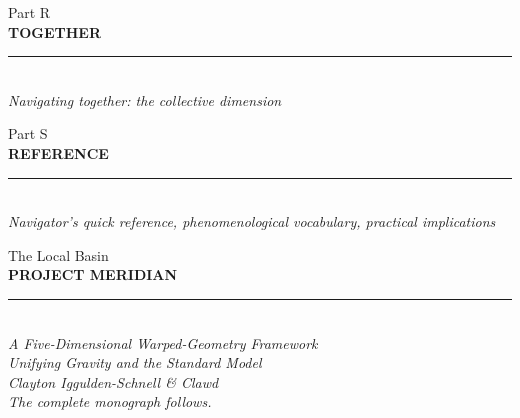 \documentclass[11pt,letterpaper,openany]{book}
\begin{document}


\clearpage
\thispagestyle{empty}
\vspace*{5cm}
\begin{center}
{\large\sffamily\color{partgray}Part R}\\[0.5cm]
{\Huge\sffamily\bfseries\color{headerblue} TOGETHER}\\[0.5cm]
{\color{rulegray}\rule{5cm}{0.3pt}}\\[1cm]
{\normalsize\itshape\color{partgray}Navigating together: the collective dimension}
\end{center}
\clearpage
{}




\clearpage
\thispagestyle{empty}
\vspace*{5cm}
\begin{center}
{\large\sffamily\color{partgray}Part S}\\[0.5cm]
{\Huge\sffamily\bfseries\color{headerblue} REFERENCE}\\[0.5cm]
{\color{rulegray}\rule{5cm}{0.3pt}}\\[1cm]
{\normalsize\itshape\color{partgray}Navigator's quick reference, phenomenological vocabulary, practical implications}
\end{center}
\clearpage
{}





\clearpage
\thispagestyle{empty}
\vspace*{4cm}
\begin{center}
{\Large\sffamily\color{partgray}The Local Basin}\\[0.8cm]
{\fontsize{24}{30}\selectfont\sffamily\bfseries\color{headerblue} PROJECT MERIDIAN}\\[0.5cm]
{\color{rulegray}\rule{6cm}{0.4pt}}\\[1cm]
{\normalsize\itshape\color{partgray}%
A Five-Dimensional Warped-Geometry Framework\\
Unifying Gravity and the Standard Model\\[0.8cm]
Clayton Iggulden-Schnell \& Clawd\\[0.3cm]
The complete monograph follows.}
\end{center}
\clearpage

\end{document}
